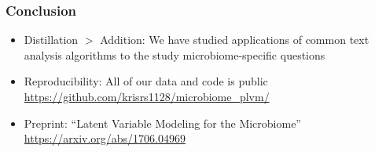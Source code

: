 \documentclass{beamer}
\begin{document}
\begin{frame}
  \frametitle{Conclusion}
 \begin{itemize}
 \item Distillation $>$ Addition: We have studied applications of common text
   analysis algorithms to the study microbiome-specific questions
 \item Reproducibility: All of our data and code is public
   \url{https://github.com/krisrs1128/microbiome_plvm/}
 \item Preprint: ``Latent Variable Modeling for the Microbiome''
   \url{https://arxiv.org/abs/1706.04969}
 \end{itemize} 
\end{frame}

\begin{frame}


\end{frame}
\end{document}

